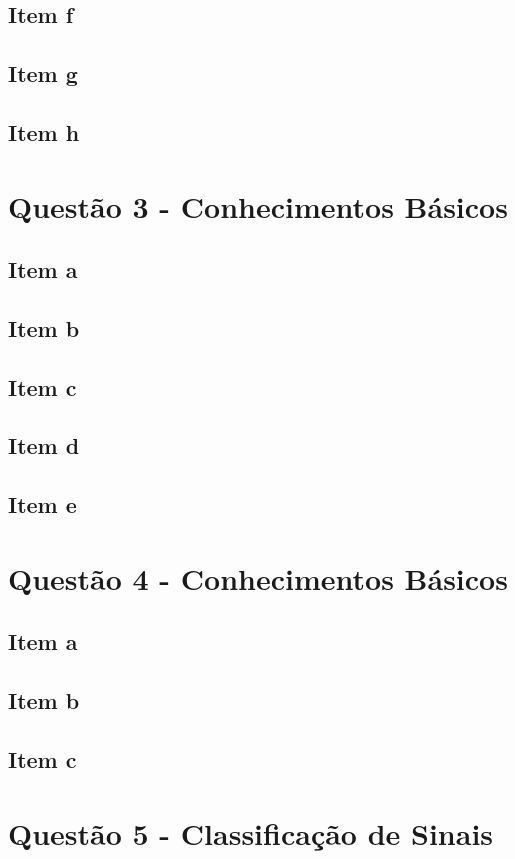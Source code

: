 \documentclass[a4paper, 12pt]{article}
\begin{document}
		\subsection{Item f}	
		\subsection{Item g}	
		\subsection{Item h}	
	\section{Quest\~{a}o 3 - Conhecimentos Básicos}
		\subsection{Item a}	
		\subsection{Item b}	
		\subsection{Item c}	
		\subsection{Item d}	
		\subsection{Item e}	
	\section{Quest\~{a}o 4 - Conhecimentos Básicos}
		\subsection{Item a}	
		\subsection{Item b}	
		\subsection{Item c}	
	\section{Quest\~{a}o 5 - Classificação de Sinais}		
\end{document}
